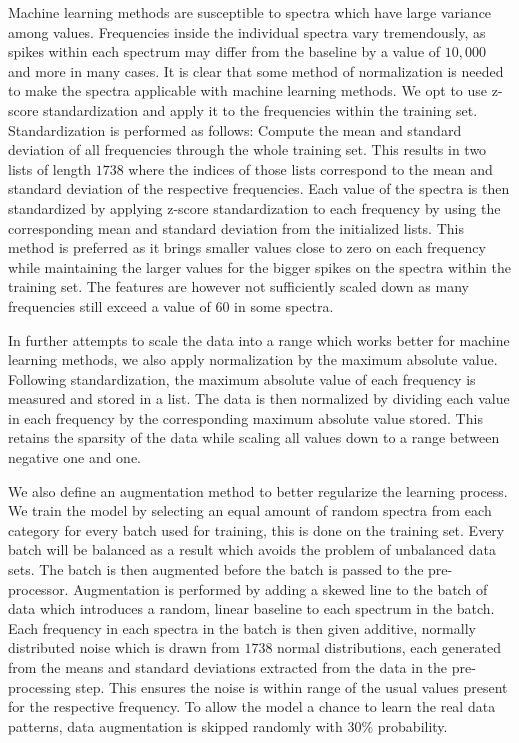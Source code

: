 Machine learning methods are susceptible to spectra which have large variance among values. Frequencies inside the individual spectra vary tremendously, as spikes within each spectrum may differ from the baseline by a value of $10,000$ and more in many cases. It is clear that some method of normalization is needed to make the spectra applicable with machine learning methods. We opt to use z-score standardization and apply it to the frequencies within the training set. Standardization is performed as follows: Compute the mean and standard deviation of all frequencies through the whole training set. This results in two lists of length $1738$ where the indices of those lists correspond to the mean and standard deviation of the respective frequencies. Each value of the spectra is then standardized by applying z-score standardization to each frequency by using the corresponding mean and standard deviation from the initialized lists. This method is preferred as it brings smaller values close to zero on each frequency while maintaining the larger values for the bigger spikes on the spectra within the training set. The features are however not sufficiently scaled down as many frequencies still exceed a value of $60$ in some spectra.

In further attempts to scale the data into a range which works better for machine learning methods, we also apply normalization by the maximum absolute value. Following standardization, the maximum absolute value of each frequency is measured and stored in a list. The data is then normalized by dividing each value in each frequency by the corresponding maximum absolute value stored. This retains the sparsity of the data while scaling all values down to a range between negative one and one.

We also define an augmentation method to better regularize the learning process. We train the model by selecting an equal amount of random spectra from each category for every batch used for training, this is done on the training set. Every batch will be balanced as a result which avoids the problem of unbalanced data sets. The batch is then augmented before the batch is passed to the pre-processor. Augmentation is performed by adding a skewed line to the batch of data which introduces a random, linear baseline to each spectrum in the batch. Each frequency in each spectra in the batch is then given additive, normally distributed noise which is drawn from $1738$ normal distributions, each generated from the means and standard deviations extracted from the data in the pre-processing step. This ensures the noise is within range of the usual values present for the respective frequency. To allow the model a chance to learn the real data patterns, data augmentation is skipped randomly with $30\%$ probability.

